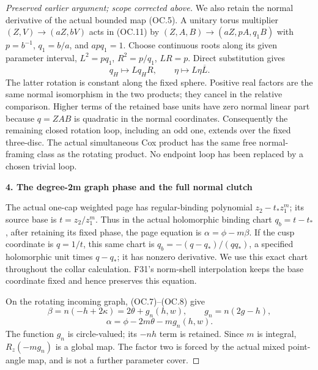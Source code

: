 \begin{proof}[Preserved earlier argument; scope corrected above]
We also retain the normal derivative of the actual bounded map (OC.5).
A unitary torus multiplier \((Z,V)\longrightarrow (aZ,bV)\) acts in (OC.11) by
\((Z,A,B)\longrightarrow (aZ,pA,q_1B)\) with \(p=b^{-1}\), \(q_1=b/a\), and \(a p q_1=1\).
Choose continuous roots along its given parameter interval,
\(L^2=p q_1\), \(R^2=p/q_1\), \(LR=p\). Direct substitution gives
\[
 q_H\longmapsto L q_H R,\qquad
 \eta\longmapsto L\eta\overline L.
 \tag{OC.15}
\]
The latter rotation is constant along the fixed sphere. Positive real
factors are the same normal isomorphism in the two products; they
cancel in the relative comparison. Higher terms of the retained base
units have zero normal linear part because \(q=ZAB\) is quadratic in
the normal coordinates. Consequently the remaining closed rotation
loop, including an odd one, extends over the fixed three-disc. The
actual simultaneous Cox product has the same free normal-framing
class as the rotating product. No endpoint loop has been replaced by
a chosen trivial loop.

\par

\medskip\noindent\textbf{4. The degree-2m graph phase and the full normal clutch}

\par\nobreak

The actual one-cap weighted page has regular-binding polynomial
\(z_2-t_* z_1^m\); its source base is \(t=z_2/z_1^m\).
Thus in the actual holomorphic binding chart \(q_b=t-t_*\), after
retaining its fixed phase, the page equation is
\(\alpha=\phi-m \beta\). If the cusp coordinate is \(q=1/t\), this same
chart is \(q_b=-(q-q_*)/(q q_*)\), a specified holomorphic unit times
\(q-q_*\); it has nonzero derivative. We use this exact chart throughout
the collar calculation. F31's norm-shell interpolation keeps the base
coordinate fixed and hence preserves this equation.

On the rotating incoming graph, (OC.7)--(OC.8) give
\[
 \beta=n(-h+2\kappa)=2\theta+g_n(h,w),\qquad
 g_n=n(2g-h),
\]
\[
 \alpha=\phi-2m\theta-m g_n(h,w).
 \tag{OC.16}
\]
The function \(g_n\) is circle-valued; its \(-n h\) term is retained.
Since \(m\) is integral, \(R_z(-m g_n)\) is a global map. The factor two
is forced by the actual mixed point-angle map, and is not a further
parameter cover.


\end{proof}
